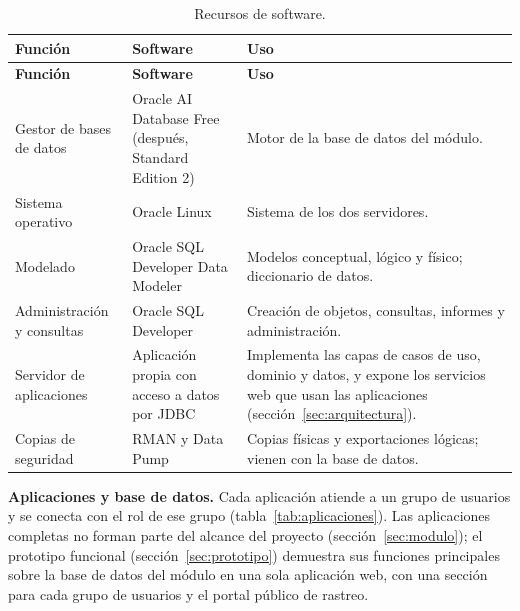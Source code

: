 {\singlespacing\small
\begin{longtable}{L{3.6cm} L{4.6cm} L{6.2cm}}
\caption{Recursos de software.}
\label{tab:software}\\
\toprule
\textbf{Función} & \textbf{Software} & \textbf{Uso} \\
\midrule
\endfirsthead
\toprule
\textbf{Función} & \textbf{Software} & \textbf{Uso} \\
\midrule
\endhead
\bottomrule
\endfoot
Gestor de bases de datos & Oracle AI Database Free (después, Standard Edition 2) & Motor de la base de datos del módulo. \\
Sistema operativo & Oracle Linux & Sistema de los dos servidores. \\
Modelado & Oracle SQL Developer Data Modeler & Modelos conceptual, lógico y físico; diccionario de datos. \\
Administración y consultas & Oracle SQL Developer & Creación de objetos, consultas, informes y administración. \\
Servidor de aplicaciones & Aplicación propia con acceso a datos por JDBC & Implementa las capas de casos de uso, dominio y datos, y expone los servicios web que usan las aplicaciones (sección~\ref{sec:arquitectura}). \\
Copias de seguridad & RMAN y Data Pump & Copias físicas y exportaciones lógicas; vienen con la base de datos. \\
\end{longtable}
\par}

\textbf{Aplicaciones y base de datos.} Cada aplicación atiende a un grupo
de usuarios y se conecta con el rol de ese grupo
(tabla~\ref{tab:aplicaciones}). Las aplicaciones completas no forman parte del alcance del proyecto
(sección~\ref{sec:modulo}); el prototipo funcional
(sección~\ref{sec:prototipo}) demuestra sus funciones principales sobre
la base de datos del módulo en una sola aplicación web, con una sección
para cada grupo de usuarios y el portal público de rastreo.

